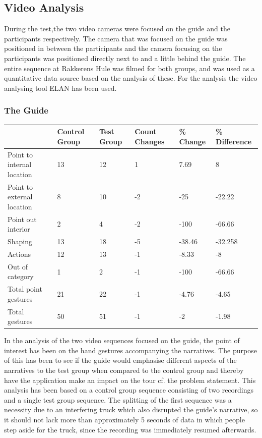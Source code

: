 \subsection{Video Analysis}
During the test,the two video cameras were focused on the guide and the participants respectively. The camera that was focused on the guide was positioned in between the participants and the camera focusing on the participants was positioned directly next to and a little behind the guide. The entire sequence at Rakkerens Hule was filmed for both groups, and was used as a quantitative data source based on the analysis of these. For the analysis the video analysing tool ELAN has been used. 

\subsubsection{The Guide}
\begin{tabular}{| p{3cm} | p{1.6cm} | p{1.4cm} | p{1.6cm} | p{1.8cm} | p{2.2cm} |}\hline \label{table:guide}
  & Control Group & Test Group & Count Changes & \% Change & \% Difference \\ \hline
Point to internal location & 13 & 12 & 1 & 7.69 & 8 \\ \hline
Point to external location & 8 & 10 & -2 & -25 & -22.22 \\ \hline
Point out interior & 2 & 4 & -2 & -100 & -66.66 \\ \hline
Shaping & 13 & 18 & -5 & -38.46 & -32.258 \\ \hline
Actions & 12 & 13 & -1 & -8.33 & -8 \\ \hline
Out of category & 1 & 2 & -1 & -100 & -66.66 \\ \hline
Total point gestures & 21 & 22 & -1 & -4.76 & -4.65 \\ \hline
Total gestures & 50 & 51 & -1 & -2 & -1.98 \\ \hline
\end{tabular}

 
In the analysis of the two video sequences focused on the guide, the point of interest has been on the hand gestures accompanying the narratives. The purpose of this has been to see if the guide would emphasise different aspects of the narratives to the test group when compared to the control group and thereby have the application make an impact on the tour cf. the problem statement. This analysis has been based on a control group sequence consisting of two recordings and a single test group sequence. The splitting of the first sequence was a necessity due to an interfering truck which also disrupted the guide’s narrative, so it should not lack more than approximately 5 seconds of data in which people step aside for the truck, since the recording was immediately resumed afterwards.

